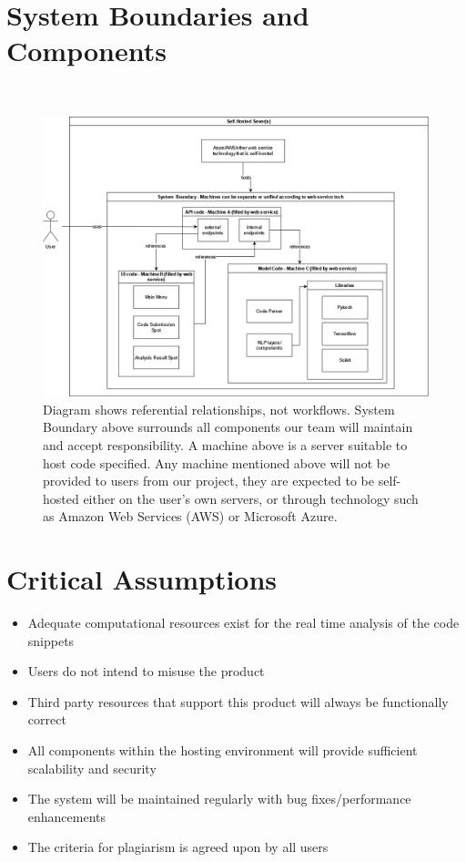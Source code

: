 \documentclass{article}
\begin{document}
\section{System Boundaries and Components}
\,
\begin{figure}
    \hspace{-3cm}
        \includegraphics[height=.58\textheight]{./assets/Component_Border.png}
\caption{Diagram shows referential relationships, not workflows. System Boundary above surrounds all components our team will maintain and accept responsibility. A machine above is a server suitable to host code specified. Any machine mentioned above will not be provided to users from our project, they are expected to be self-hosted either on the user's own servers, or through technology such as Amazon Web Services (AWS) or Microsoft Azure.}
\end{figure}



\section{Critical Assumptions}
\begin{itemize}
    \item Adequate computational resources exist for the real time analysis of the code snippets
    \item Users do not intend to misuse the product
    \item Third party resources that support this product will always be functionally correct
    \item All components within the hosting environment will provide sufficient scalability and security
    \item The system will be maintained regularly with bug fixes/performance enhancements
    \item The criteria for plagiarism is agreed upon by all users
\end{itemize}
\end{document}
